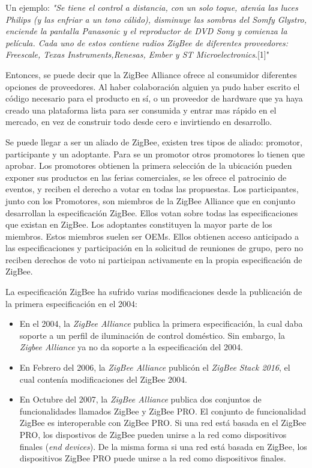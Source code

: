 \documentclass[10pt,journal,compsoc]{IEEEtran}
\begin{document}
  Un ejemplo: \emph{"Se tiene el control a distancia, con un solo toque, atenúa las luces Philips (y las enfriar a un tono cálido), disminuye las sombras del Somfy Glystro, enciende la pantalla Panasonic y el reproductor de DVD Sony y comienza la película. Cada uno de estos contiene radios ZigBee de diferentes proveedores: Freescale, Texas Instruments,Renesas, Ember y ST Microelectronics}.[1]"
  
Entonces, se puede decir que la ZigBee Alliance ofrece al consumidor diferentes opciones de proveedores. Al haber colaboración alguien ya pudo haber escrito el código necesario para el producto en sí, o un proveedor de hardware que ya haya creado una plataforma lista para ser consumida y entrar mas rápido en el mercado, en vez de construir todo desde cero e invirtiendo en desarrollo.  
 
 Se puede llegar a ser un aliado de ZigBee, existen tres tipos de aliado: promotor, participante y un adoptante. Para se un promotor otros promotores lo tienen que aprobar. Los promotores obtienen la primera selección de la ubicación pueden exponer sus productos en las ferias comerciales, se les ofrece el patrocinio de eventos, y reciben  el derecho a votar en todas las propuestas.
 Los participantes, junto con los Promotores, son miembros de la ZigBee Alliance que en conjunto desarrollan la especificación ZigBee. Ellos votan sobre todas las especificaciones que existan en ZigBee. Los adoptantes constituyen la mayor parte de los miembros. Estos miembros suelen ser OEMs. Ellos obtienen acceso anticipado a las especificaciones y participación en la solicitud de reuniones de grupo, pero no reciben derechos de voto ni participan activamente en la propia especificación de ZigBee.

La especificación ZigBee ha sufrido varias modificaciones desde la publicación de la primera especificación en el 2004:
\begin{itemize}
    \item En el 2004, la \emph{ZigBee Alliance} publica la primera especificación, la cual daba soporte a un perfil de iluminación de control doméstico. Sin embargo, la \emph{Zigbee Alliance} ya no da soporte a la especificación del 2004.
    \item En Febrero del 2006, la \emph{ZigBee Alliance} publicón el \emph{ZigBee Stack 2016}, el cual contenía modificaciones del ZigBee 2004.
   \item En Octubre del 2007, la \emph{ZigBee Alliance} publica dos conjuntos de funcionalidades llamados ZigBee y ZigBee PRO. El conjunto de funcionalidad ZigBee es interoperable con ZigBee PRO. Si una red está basada en el ZigBee PRO, los dispostivos de ZigBee pueden unirse a la red como dispositivos finales (\emph{end devices}). De la misma forma si una red está basada en ZigBee, los dispositivos ZigBee PRO puede unirse a la red como dispositivos finales.
\end{itemize}
\end{document}

